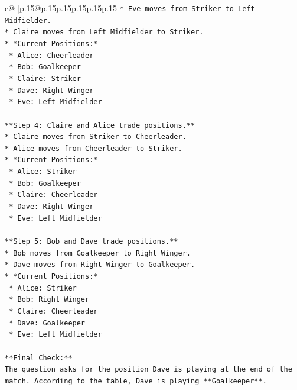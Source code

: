 \documentclass{article}
\begin{document}
{\begin{supertabular}{c@{$\;$}|p{.15\linewidth}@{}p{.15\linewidth}p{.15\linewidth}p{.15\linewidth}p{.15\linewidth}p{.15\linewidth}}
{{{\texttt{*   Eve moves from Striker to Left Midfielder.} \\
\texttt{*   Claire moves from Left Midfielder to Striker.} \\
\texttt{*   *Current Positions:*} \\
\texttt{    *   Alice: Cheerleader} \\
\texttt{    *   Bob: Goalkeeper} \\
\texttt{    *   Claire: Striker} \\
\texttt{    *   Dave: Right Winger} \\
\texttt{    *   Eve: Left Midfielder} \\
\\ 
\texttt{**Step 4: Claire and Alice trade positions.**} \\
\texttt{*   Claire moves from Striker to Cheerleader.} \\
\texttt{*   Alice moves from Cheerleader to Striker.} \\
\texttt{*   *Current Positions:*} \\
\texttt{    *   Alice: Striker} \\
\texttt{    *   Bob: Goalkeeper} \\
\texttt{    *   Claire: Cheerleader} \\
\texttt{    *   Dave: Right Winger} \\
\texttt{    *   Eve: Left Midfielder} \\
\\ 
\texttt{**Step 5: Bob and Dave trade positions.**} \\
\texttt{*   Bob moves from Goalkeeper to Right Winger.} \\
\texttt{*   Dave moves from Right Winger to Goalkeeper.} \\
\texttt{*   *Current Positions:*} \\
\texttt{    *   Alice: Striker} \\
\texttt{    *   Bob: Right Winger} \\
\texttt{    *   Claire: Cheerleader} \\
\texttt{    *   Dave: Goalkeeper} \\
\texttt{    *   Eve: Left Midfielder} \\
\\ 
\texttt{**Final Check:**} \\
\texttt{The question asks for the position Dave is playing at the end of the match. According to the table, Dave is playing **Goalkeeper**.} \\
\\ 
}}}
\end{supertabular}}
\end{document}
